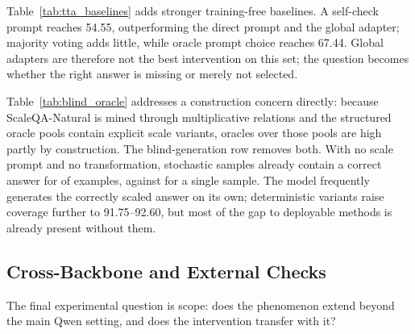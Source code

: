 \begin{table}[h]
\centering
\small

\caption{Training-free prompting baselines on ScaleQA-Natural-473 with the answer-tuned Qwen2.5-VL-7B pipeline.}
\label{tab:tta_baselines}
\end{table}

Table~\ref{tab:tta_baselines} adds stronger training-free baselines. A self-check prompt reaches 54.55, outperforming the direct prompt and the global adapter; majority voting adds little, while oracle prompt choice reaches 67.44. Global adapters are therefore not the best intervention on this set; the question becomes whether the right answer is missing or merely not selected.

\begin{table}[h]
\centering
\small
\resizebox{\linewidth}{!}{}
\caption{Candidate coverage on ScaleQA-Natural-473 decomposed by candidate source. Blind sampling uses no scale prompt and no deterministic transformation, so its coverage is not implied by the mining rule.}
\label{tab:blind_oracle}
\end{table}

Table~\ref{tab:blind_oracle} addresses a construction concern directly: because ScaleQA-Natural is mined through multiplicative relations and the structured oracle pools contain explicit scale variants, oracles over those pools are high partly by construction. The blind-generation row removes both. With no scale prompt and no transformation,  stochastic samples already contain a correct answer for  of examples, against  for a single sample. The model frequently generates the correctly scaled answer on its own; deterministic variants raise coverage further to 91.75--92.60, but most of the gap to deployable methods is already present without them.

\subsection{Cross-Backbone and External Checks}

The final experimental question is scope: does the phenomenon extend beyond the main Qwen setting, and does the intervention transfer with it?

\begin{table}[h]
\centering
\small
\resizebox{\linewidth}{!}{}
\caption{Transfer boundary summary. Full cross-backbone and external rows are in the appendix.}
\label{tab:transfer_boundary}
\end{table}

